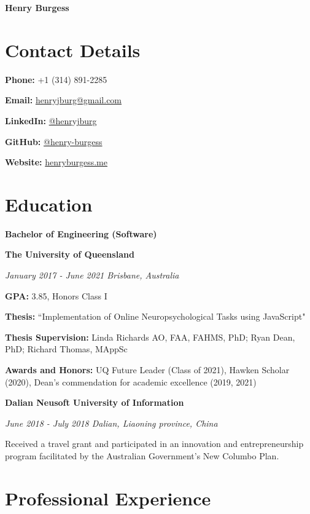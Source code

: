 \documentclass{article}
\begin{document}
  {\Huge\textbf{Henry Burgess}}

  \section*{Contact Details}

  \textbf{Phone:} +1 (314) 891-2285

  \textbf{Email:} \href{mailto:henryjburg@gmail.com}{henryjburg@gmail.com}

  \textbf{LinkedIn:} \href{https://www.linkedin.com/in/henryjburg/}{@henryjburg}

  \textbf{GitHub:} \href{https://github.com/henry-burgess}{@henry-burgess}

  \textbf{Website:} \href{https://henryburgess.me/}{henryburgess.me}

  \section*{Education}

  {\large\textbf{Bachelor of Engineering (Software)}}

  \textbf{The University of Queensland}

  \textit{January 2017 - June 2021 \hfill Brisbane, Australia}

  \textbf{GPA:} 3.85, Honors Class I

  \textbf{Thesis:} ``Implementation of Online Neuropsychological Tasks using JavaScript"

  \textbf{Thesis Supervision:} Linda Richards AO, FAA, FAHMS, PhD; Ryan Dean, PhD; Richard Thomas, MAppSc

  \textbf{Awards and Honors:} UQ Future Leader (Class of 2021), Hawken Scholar (2020), Dean's commendation for academic excellence (2019, 2021)

  \medbreak

  {\large\textbf{Dalian Neusoft University of Information}}

  \textit{June 2018 - July 2018 \hfill Dalian, Liaoning province, China}

  Received a travel grant and participated in an innovation and entrepreneurship program facilitated by the Australian Government's New Columbo Plan.

  \section*{Professional Experience}
\end{document}
